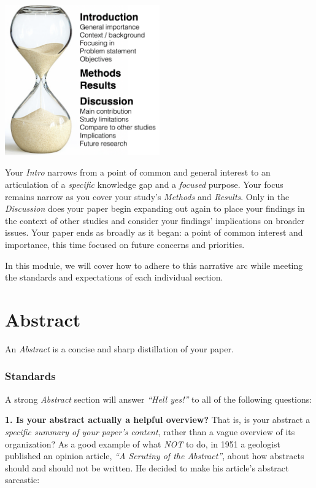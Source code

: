 \documentclass[]{book}
\begin{document}
\includegraphics[width=0.5\textwidth,height=\textheight]{img/hourglass.png}

Your \emph{Intro} narrows from a point of common and general interest to an articulation of a \emph{specific} knowledge gap and a \emph{focused} purpose. Your focus remains narrow as you cover your study's \emph{Methods} and \emph{Results}. Only in the \emph{Discussion} does your paper begin expanding out again to place your findings in the context of other studies and consider your findings' implications on broader issues. Your paper ends as broadly as it began: a point of common interest and importance, this time focused on future concerns and priorities.

In this module, we will cover how to adhere to this narrative arc while meeting the standards and expectations of each individual section.

\hypertarget{abstract}{%
\section*{Abstract}\label{abstract}}

An \emph{Abstract} is a concise and sharp distillation of your paper.

\hypertarget{standards}{%
\subsubsection*{Standards}\label{standards}}

A strong \emph{Abstract} section will answer \emph{``Hell yes!''} to all of the following questions:

\textbf{1. Is your abstract actually a helpful overview?} That is, is your abstract a \emph{specific summary of your paper's content}, rather than a vague overview of its organization? As a good example of what \emph{NOT} to do, in 1951 a geologist published an opinion article, \emph{``A Scrutiny of the Abstract''}, about how abstracts should and should not be written. He decided to make his article's abstract sarcastic:
\end{document}
